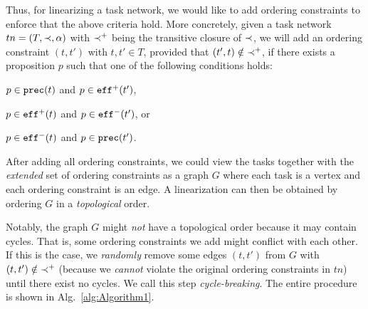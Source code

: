 Thus, for linearizing a task network, we would like to add ordering constraints to enforce that the above criteria hold. More concretely, given a task network $tn = (T, \mathord{\prec}{}, \alpha)$ with $\mathord{\prec}{}^{+}$ being the transitive closure of $\mathord{\prec}{}$, we will add an ordering constraint $(t, t')$ with $t, t' \in T$, provided that $(t' ,t ) \notin \mathord{\prec}{}^{+}$, if there exists a proposition $p$ such that one of the following conditions holds:
\begin{inparaenum}[1)]
    \item $p \in \mathtt{prec}(t)$ and $p \in \mathtt{eff}^{+}(t')$,
    \item $p \in \mathtt{eff}^{+}(t)$ and $p \in \mathtt{eff}^{-}(t')$, or
    \item $p \in \mathtt{eff}^{-}(t)$ and $p \in \mathtt{prec}(t')$. 
\end{inparaenum}
After adding all ordering constraints, we could view the tasks together with the \emph{extended} set of ordering constraints as a graph $G$ where each task is a vertex and each ordering constraint is an edge. A linearization can then be obtained by ordering $G$ in a \emph{topological} order.

Notably, the graph $G$ might \emph{not} have a topological order because it may contain cycles. That is, some ordering constraints we add might conflict with each other. If this is the case, we \emph{randomly} remove some edges $(t, t')$ from $G$ with $(t, t') \notin \mathord{\prec}{}^{+}$ (because we \emph{cannot} violate the original ordering constraints in $tn$) until there exist no cycles. We call this step \emph{cycle-breaking}. The entire procedure is shown in Alg.~\ref{alg:Algorithm1}.



